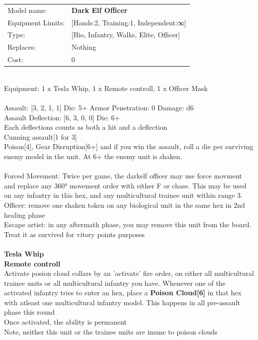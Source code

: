{\noindent
\begin{tabular}{ll}
Model name: &{\bf Dark Elf Officer } \\
Equipment Limits: &[Hands:2, Training:1, Independent:∞] \\
Type: &[Bio, Infantry, Walks, Elite, Officer] \\
Replaces: &Nothing \\
Cost: & 0\\
\end{tabular}
\ \\
Equipment: 1 x Tesla Whip, 1 x Remote controll, 1 x Officer Mask \\
\ \\
Assault: [3, 2, 1, 1] Die: 5+ Armor Penetration: 0 Damage: d6 \\
Assault Deflection: [6, 3, 0, 0] Die: 6+\\
\indent Each deflections counts as both a hit and a deflection\\ 
Cunning assault[1 for 3]\\ 
Poison[4], Gear Disruption[6+] and if you win the assault, roll a die per surviving enemy model in the unit. At 6+ the enemy unit is shaken. \\ 
 
\ \\
Forced Movement: Twice per game, the darkelf officer may use force movment and replace any 360° movement order with either F or chase. This may be used on any infantry in this hex, and any  multicultural trainee unit within range 3.\\ 
Officer: remove one shaken token on any biological unit in the same hex in 2nd healing  phase\\ 
Escape artist: in any aftermath phase, you may remove this unit from the board. Treat it as survived for vitory points purposes\\ 

\ \\
{\bf Tesla Whip } \\






{\bf Remote controll } \\

Activate posion cloud collars by an 'activate' fire order, on either all multicultural trainee units or all multicultural infantry you have. Whenever one of the activated infantry tries to enter an hex, place a {{\bf Poison Cloud[6]}} in that hex with atleast one multicultural infantry model. This happens in all pre-assault phase this round\\ 
Once activated, the ability is permanent\\ 
Note, neither this unit or the trainee units are imune to poison clouds\\ 





}
